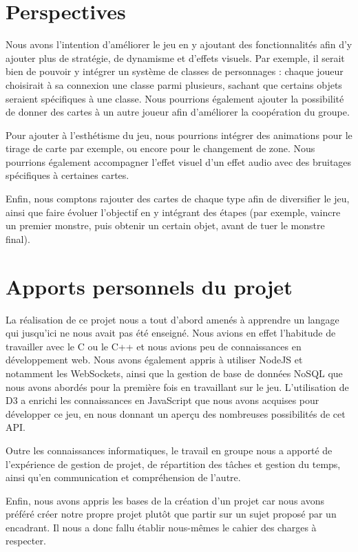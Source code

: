 \documentclass[12pt]{report}
\begin{document}
  \section*{Perspectives}
	Nous avons l'intention d'améliorer le jeu en y ajoutant des fonctionnalités afin d'y ajouter plus de stratégie, de dynamisme et d'effets visuels. Par exemple, il serait bien de pouvoir y intégrer un système de classes de personnages : chaque joueur choisirait à sa connexion une classe parmi plusieurs, sachant que certains objets seraient spécifiques à une classe. Nous pourrions également ajouter la possibilité de donner des cartes à un autre joueur afin d'améliorer la coopération du groupe.

  Pour ajouter à l'esthétisme du jeu, nous pourrions intégrer des animations pour le tirage de carte par exemple, ou encore pour le changement de zone. Nous pourrions également accompagner l'effet visuel d'un effet audio avec des bruitages spécifiques à certaines cartes.

  Enfin, nous comptons rajouter des cartes de chaque type afin de diversifier le jeu, ainsi que faire évoluer l'objectif en y intégrant des étapes (par exemple, vaincre un premier monstre, puis obtenir un certain objet, avant de tuer le monstre final).

  \section*{Apports personnels du projet}
  La réalisation de ce projet nous a tout d'abord amenés à apprendre un langage qui jusqu'ici ne nous avait pas été enseigné. Nous avions en effet l'habitude de travailler avec le C ou le C++ et nous avions peu de connaissances en développement web. Nous avons également appris à utiliser NodeJS et notamment les WebSockets, ainsi que la gestion de base de données NoSQL que nous avons abordés pour la première fois en travaillant sur le jeu. L'utilisation de D3 a enrichi les connaissances en JavaScript que nous avons acquises pour développer ce jeu, en nous donnant un aperçu des nombreuses possibilités de cet API.

  Outre les connaissances informatiques, le travail en groupe nous a apporté de l'expérience de gestion de projet, de répartition des tâches et gestion du temps, ainsi qu'en communication et compréhension de l'autre.

  Enfin, nous avons appris les bases de la création d'un projet car nous avons préféré créer notre propre projet plutôt que partir sur un sujet proposé par un encadrant. Il nous a donc fallu établir nous-mêmes le cahier des charges à respecter.
\end{document}
